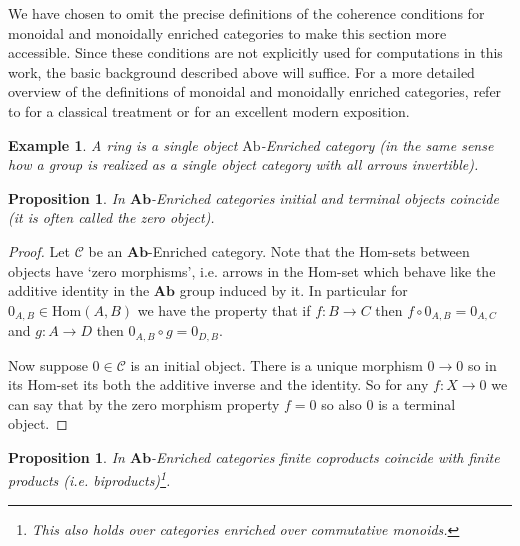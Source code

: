 \documentclass[12pt]{report}
\numberwithin{equation}{section}
\newcommand{\Hom}{{\mathrm{Hom}}}
\newtheorem{proposition}[dummy]{Proposition}
\newtheorem{example}[dummy]{Example}
\begin{document}
	We have chosen to omit the precise definitions of the coherence conditions for monoidal and monoidally enriched categories to make this section more accessible. Since these conditions are not explicitly used for computations in this work, the basic background described above will suffice. For a more detailed overview of the definitions of monoidal and monoidally enriched categories, refer to \cite{lane1998categories} for a classical treatment or \cite{riehl2017category} for an excellent modern exposition.
	\begin{example}
		A ring is a single object $\mathrm{Ab}$-Enriched category (in the same sense how a group is realized as a single object category with all arrows invertible).
	\end{example}
	
	
	\begin{proposition}
		In $\mathbf{Ab}$-Enriched categories initial and terminal objects coincide (it is often called the zero object).
	\end{proposition}
	\begin{proof}
		Let $\mathcal{C}$ be an $\mathbf{Ab}$-Enriched category. Note that the Hom-sets between objects have `zero morphisms', i.e. arrows in the Hom-set which behave like the additive identity in the $\mathbf{Ab}$ group induced by it. In particular for $0_{A,B}\in \Hom(A,B)$ we have the property that if $f:B \to C$ then $f\circ 0_{A,B}=0_{A,C}$ and $g: A \to D$ then $0_{A,B}\circ g=0_{D,B}$.
		
		Now suppose $0 \in \mathcal{C}$ is an initial object. There is a unique morphism $0\to 0$ so in its Hom-set its both the additive inverse and the identity. So for any $f:X \to 0$ we can say that by the zero morphism property $f=0$ so also $0$ is a terminal object.
	\end{proof}
	\begin{proposition}
		In $\mathbf{Ab}$-Enriched categories finite coproducts coincide with finite products (i.e. biproducts)\footnote{This also holds over categories enriched over commutative monoids.}.
	\end{proposition}
\end{document}
